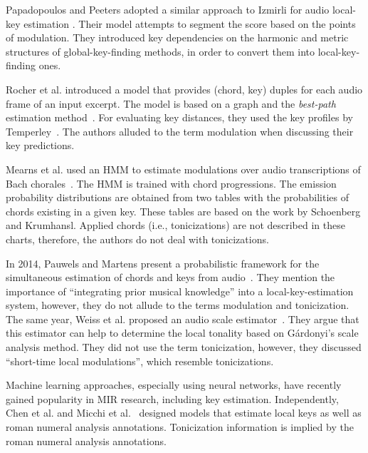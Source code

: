 Papadopoulos and Peeters adopted a similar approach to Izmirli for audio local-key estimation \cite{papadopoulos_local_2009}.
Their model attempts to segment the score based on the points of modulation. 
They introduced key dependencies on the harmonic and metric structures of global-key-finding methods, in order to convert them into local-key-finding ones. 

Rocher et al. introduced a model that provides (chord, key) duples for each audio frame of an input excerpt. 
The model is based on a graph and the \emph{best-path} estimation method~\cite{thomas_rocher_2010_1417485}. 
For evaluating key distances, they used the key profiles by Temperley~\cite{Temperley99:tonality}. The authors alluded to the term modulation when discussing their key predictions.

Mearns et al. used an HMM to estimate modulations over audio transcriptions of Bach chorales~\cite{mearns2011automatically}. 
The HMM is trained with chord progressions. 
The emission probability distributions are obtained from two tables with the probabilities of chords existing in a given key. 
These tables are based on the work by Schoenberg and Krumhansl. 
Applied chords (i.e., tonicizations) are not described in these charts, therefore, the authors do not deal with tonicizations.

In 2014, Pauwels and Martens present a probabilistic framework for the simultaneous estimation of chords and keys from audio~\cite{pauwels_combining_2014}. 
They mention the importance of ``integrating prior musical knowledge'' into a local-key-estimation system, however, they do not allude to the terms modulation and tonicization. 
The same year, Weiss et al. proposed an audio scale estimator~\cite{weiss2014chroma}. 
They argue that this estimator can help to determine the local tonality based on G\'{a}rdonyi's scale analysis method. 
They did not use the term tonicization, however, they discussed ``short-time local modulations'', which resemble tonicizations.

Machine learning approaches, especially using neural networks, have recently gained popularity in MIR research, including key estimation. 
Independently, Chen et al. \cite{chen18harmony,chen19harmony} and Micchi et al.~\cite{Micchi20:roman} designed models that estimate local keys as well as roman numeral analysis annotations. Tonicization information is implied by the roman numeral analysis annotations. 

